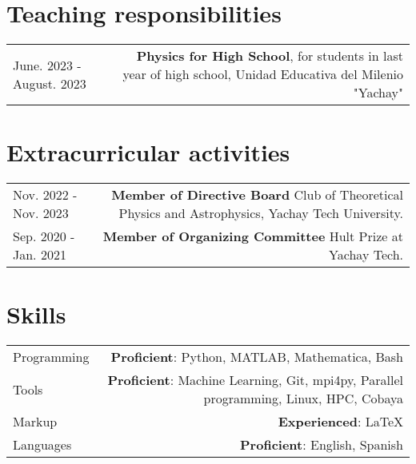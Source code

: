 \documentclass{article}
\begin{document}
\section*{Teaching responsibilities}

\begin{tabular}{L!{\vrule}R}

  June. 2023 - August. 2023 & \textbf{Physics for High School}, for students in last year of high school, Unidad Educativa del Milenio "Yachay"\\

\end{tabular}


\section*{Extracurricular activities}
\begin{tabular}{L!{\vrule}R}

  Nov. 2022 - Nov. 2023 & \textbf{Member of Directive Board} Club of Theoretical Physics and Astrophysics, Yachay Tech University. \\

  Sep. 2020 - Jan. 2021 & \textbf{Member of Organizing Committee} Hult Prize at Yachay Tech. \\
\end{tabular}

\section*{Skills}

\begin{tabular}{L!{\vrule}R}
	Programming & \textbf{Proficient}: Python, MATLAB, Mathematica, Bash \\
  Tools & \textbf{Proficient}: Machine Learning, Git, mpi4py, Parallel programming, Linux, HPC, Cobaya\\
	Markup & \textbf{Experienced}: LaTeX\\
	Languages & \textbf{Proficient}: English, Spanish\\
\end{tabular}
\end{document}
